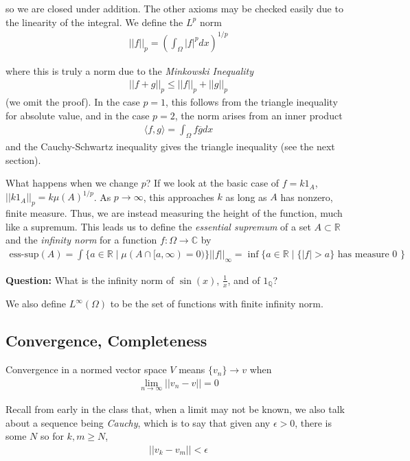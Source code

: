 \documentclass{article}
\newcommand{\R}{{\mathbb{R}}}
\newcommand{\C}{{\mathbb{C}}}
\newcommand{\Q}{{\mathbb{Q}}}
\newcommand{ \norm }[1]{{ || {#1}||}}
\newcommand{\cl}[1]{{\overline{#1}}}
\begin{document}
	so we are closed under addition. The other axioms may be checked easily due to the linearity of the integral. We define the $L^p$ norm
	\begin{align*}
		\norm{f}_{p} = \left( \int_{\Omega} |f|^{p} dx\right)^{1/p}
	\end{align*} 
	
	where this is truly a norm due to the \textit{Minkowski Inequality}
	\begin{align*}
		\norm{f+g}_{p} \leq \norm{f}_{p} + \norm{g}_{p}
	\end{align*}
	(we omit the proof). In the case $p=1$, this follows from the triangle inequality for absolute value, and in the case $p=2$, the norm arises from an inner product
	\begin{align*}
		\langle f,g \rangle = \int_{\Omega} f \cl{g} dx
	\end{align*}
	and the Cauchy-Schwartz inequality gives the triangle inequality (see the next section). 
	
	
	What happens when we change $p$? If we look at the basic case of $f = k1_{A}$, $\norm{k1_{A}}_{p} = k\mu(A)^{1/p}$. As $p \to \infty$, this approaches $k$ as long as $A$ has nonzero, finite measure. Thus, we are instead measuring the height of the function, much like a supremum. This leads us to define the \textit{essential supremum} of a set $A \subset \R$ and the \textit{infinity norm} for a function $f: \Omega \to \C$ by 
	\begin{align*}
		\text{ess-sup}(A) = \int \{a \in \R \mid \mu(A \cap [a,\infty) = 0)\}
		\norm{f}_{\infty} = \inf \{ a \in \R \mid \{|f| > a\} \text{ has measure 0 }\}
	\end{align*}
	
	\textbf{Question:} What is the infinity norm of $\sin(x)$, $\frac{1}{x}$, and of $1_{\Q}$?
	
	We also define $L^{\infty}(\Omega)$ to be the set of functions with finite infinity norm. 
	
	\subsection{Convergence, Completeness}
	
	Convergence in a normed vector space $V$ means $\{v_{n}\} \to v$ when
	\begin{align*}
		\lim_{n \to \infty} \norm{v_{n} - v} = 0
	\end{align*}
	
	Recall from early in the class that, when a limit may not be known, we also talk about a sequence being \textit{Cauchy}, which is to say that given any $\epsilon > 0$, there is some $N$ so for $k,m \geq N$, 
	\begin{align*}
		\norm{v_{k}-v_{m}} < \epsilon
	\end{align*}
	
\end{document}
